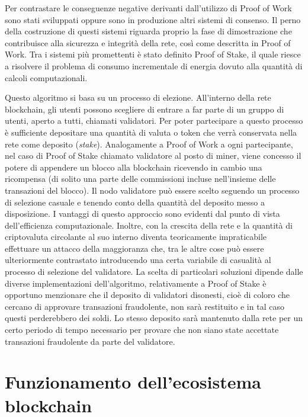 Per contrastare le conseguenze negative derivanti dall’utilizzo di Proof of Work sono stati sviluppati oppure sono in produzione altri sistemi di consenso. Il perno della costruzione di questi sistemi riguarda proprio la fase di dimostrazione che contribuisce alla sicurezza e integrità della rete, così come descritta in Proof of Work. Tra i sistemi più promettenti è stato definito Proof of Stake, il quale riesce a risolvere il problema di consumo incrementale di energia dovuto alla quantità di calcoli computazionali.

Questo algoritmo si basa su un processo di elezione. All’interno della rete blockchain, gli utenti possono scegliere di entrare a far parte di un gruppo di utenti, aperto a tutti, chiamati validatori. Per poter partecipare a questo processo è sufficiente depositare una quantità di valuta o token che verrà conservata nella rete come deposito (\emph{stake}). Analogamente a Proof of Work a ogni partecipante, nel caso di Proof of Stake chiamato validatore al posto di miner, viene concesso il potere di appendere un blocco alla blockchain ricevendo in cambio una ricompensa (di solito una parte delle commissioni incluse nell’insieme delle transazioni del blocco). Il nodo validatore può essere scelto seguendo un processo di selezione casuale e tenendo conto della quantità del deposito messo a disposizione. I vantaggi di questo approccio sono evidenti dal punto di vista dell’efficienza computazionale. Inoltre, con la crescita della rete e la quantità di criptovaluta circolante al suo interno diventa teoricamente impraticabile effettuare un attacco della maggioranza che, tra le altre cose può essere ulteriormente contrastato introducendo una certa variabile di casualità al processo di selezione del validatore. La scelta di particolari soluzioni dipende dalle diverse implementazioni dell'algoritmo, relativamente a Proof of Stake è opportuno menzionare che il deposito di validatori disonesti, cioè di coloro che cercano di approvare transazioni fraudolente, non sarà restituito e in tal caso questi perderebbero dei soldi. Lo stesso deposito sarà mantenuto dalla rete per un certo periodo di tempo necessario per provare che non siano state accettate transazioni fraudolente da parte del validatore.


\section{Funzionamento dell'ecosistema blockchain} %

